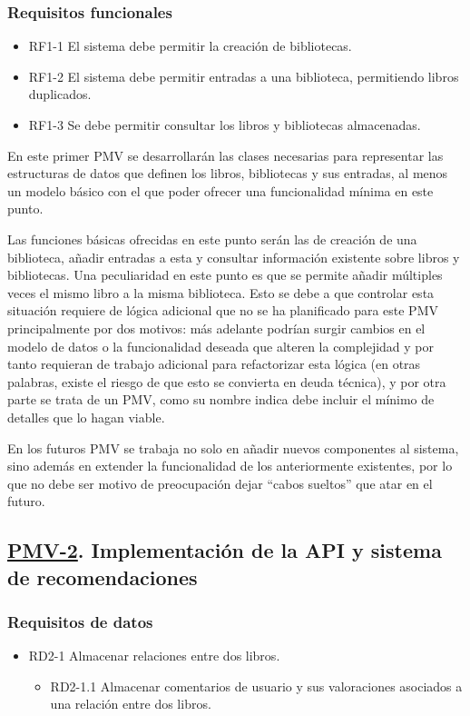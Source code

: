 \subsubsection{Requisitos funcionales}
\begin{itemize}
    \item RF1-1 El sistema debe permitir la creación de bibliotecas.
    \item RF1-2 El sistema debe permitir entradas a una biblioteca, permitiendo libros duplicados.
    \item RF1-3 Se debe permitir consultar los libros y bibliotecas almacenadas.
\end{itemize}

En este primer PMV se desarrollarán las clases necesarias para representar las estructuras de datos que definen los libros, bibliotecas y sus entradas, al menos un modelo básico con el que poder ofrecer una funcionalidad mínima en este punto.

Las funciones básicas ofrecidas en este punto serán las de creación de una biblioteca, añadir entradas a esta y consultar información existente sobre libros y bibliotecas. Una peculiaridad en este punto es que se permite añadir múltiples veces el mismo libro a la misma biblioteca. Esto se debe a que controlar esta situación requiere de lógica adicional que no se ha planificado para este PMV principalmente por dos motivos: más adelante podrían surgir cambios en el modelo de datos o la funcionalidad deseada que alteren la complejidad y por tanto requieran de trabajo adicional para refactorizar esta lógica (en otras palabras, existe el riesgo de que esto se convierta en deuda técnica), y por otra parte se trata de un PMV, como su nombre indica debe incluir el mínimo de detalles que lo hagan viable.

En los futuros PMV se trabaja no solo en añadir nuevos componentes al sistema, sino además en extender la funcionalidad de los anteriormente existentes, por lo que no debe ser motivo de preocupación dejar ``cabos sueltos'' que atar en el futuro.

\subsection{\href{https://github.com/Anglepi/My-Many-Reads/milestone/3}{PMV-2}. Implementación de la API y sistema de recomendaciones}

\subsubsection{Requisitos de datos}
\begin{itemize}
    \item RD2-1 Almacenar relaciones entre dos libros.
    \begin{itemize}
        \item RD2-1.1 Almacenar comentarios de usuario y sus valoraciones asociados a una relación entre dos libros.
    \end{itemize}
\end{itemize}

